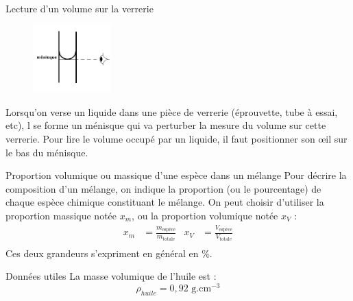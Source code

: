 \begin{doc}{Lecture d'un volume sur la verrerie}

\begin{figure}
\vspace{-2cm}
    \centering
      \includegraphics[width=0.27\textwidth]{Images/Activite/Chap1/Lecture_Verrerie.png}
  \end{figure}
  Lorsqu'on verse un liquide dans une pièce de verrerie (éprouvette, tube à essai, etc), l se forme un ménisque qui va perturber la mesure du volume sur cette verrerie. Pour lire le volume occupé par un liquide, il faut positionner son \oe il sur le bas du ménisque.%
\end{doc}

\begin{doc}{Proportion volumique ou massique d’une espèce dans un mélange}
Pour décrire la composition d’un mélange, on indique la proportion (ou le pourcentage) de chaque espèce chimique constituant le mélange. On peut choisir d’utiliser la proportion massique notée $x_m$, ou la proportion volumique notée $x_V$ :
\begin{align*}
    x_m &= \frac{m_{\text{espèce}}}{m_{\text{totale}}} & x_V & = \frac{V_{\text{espèce}}}{V_{\text{totale}}}\\
\end{align*}
Ces deux grandeurs s'expriment en général en \%.
\end{doc}

\begin{doc}{Données utiles}
La masse volumique de l'huile est :
\begin{equation*}
    \rho_{huile} = 0,92 \text{~g.cm$^{-3}$}
    \end{equation*}
\end{doc}
